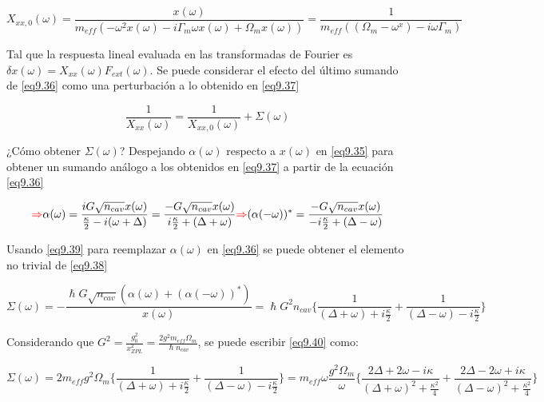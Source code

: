 \documentclass{book}
\begin{document}
\begin{equation}\label{eq9.37}X_{xx,0}(\omega)=\frac{x(\omega)}{m_{eff}(-\omega^2 x(\omega)-i\Gamma_m\omega x(\omega)+\Omega_mx(\omega))}=\frac{1}{m_{eff}((\Omega_m-\omega^x)-i\omega\Gamma_m)}\end{equation}

Tal que la respuesta lineal evaluada en las transformadas de Fourier es $\delta x(\omega)=X_{xx}(\omega)F_{ext}(\omega)$. Se puede considerar el efecto del último sumando de \ref{eq9.36} como una perturbación a lo obtenido en \ref{eq9.37}

\begin{equation}\label{eq9.38}\frac{1}{X_{xx}(\omega)}=\frac{1}{X_{xx,0}(\omega)}+\Sigma(\omega)\end{equation}

¿Cómo obtener $\Sigma(\omega)$? Despejando $\alpha(\omega)$ respecto a $x(\omega)$ en \ref{eq9.35} para obtener un sumando análogo a los obtenidos en \ref{eq9.37} a partir de la ecuación \ref{eq9.36}

\begin{equation}\label{eq9.39}\textcolor{red}{\Rightarrow}\alpha(\omega)=\frac{iG\sqrt{n_{cav}}x(\omega)}{\frac{\kappa}{2}-i(\omega+\Delta)}=\frac{-G\sqrt{n_{cav}}x(\omega)}{i\frac{\kappa}{2}+(\Delta+\omega)}\textcolor{red}{\Rightarrow}(\alpha(-\omega))^*=\frac{-G\sqrt{n_{cav}}x(\omega)}{-i\frac{\kappa}{2}+(\Delta-\omega)}\end{equation}

Usando \ref{eq9.39} para reemplazar $\alpha(\omega)$ en \ref{eq9.36} se puede obtener el elemento no trivial de \ref{eq9.38}

\begin{equation}\label{eq9.40}\Sigma(\omega)=-\frac{\hslash G\sqrt{n_{cav}}(\alpha(\omega)+(\alpha(-\omega))^*)}{x(\omega)}=\hslash G^2 n_{cav}\{\frac{1}{(\Delta+\omega)+i\frac{\kappa}{2}}+\frac{1}{(\Delta-\omega)-i\frac{\kappa}{2}}\}\end{equation}

Considerando que $G^2=\frac{g_0^2}{x_{ZPL}^2}=\frac{2g^2m_{eff}\Omega_m}{\hslash n_{cav}}$, se puede escribir \ref{eq9.40} como:

\begin{equation}\label{eq9.41}\Sigma(\omega)=2m_{eff}g^2\Omega_m\{\frac{1}{(\Delta+\omega)+i\frac{\kappa}{2}}+\frac{1}{(\Delta-\omega)-i\frac{\kappa}{2}}\}=m_{eff}\omega\frac{g^2\Omega_m}{\omega}\{\frac{2\Delta+2\omega-i\kappa}{(\Delta+\omega)^2+\frac{\kappa^2}{4}}+\frac{2\Delta-2\omega+i\kappa}{(\Delta-\omega)^2+\frac{\kappa^2}{4}}\}\end{equation}
\end{document}
